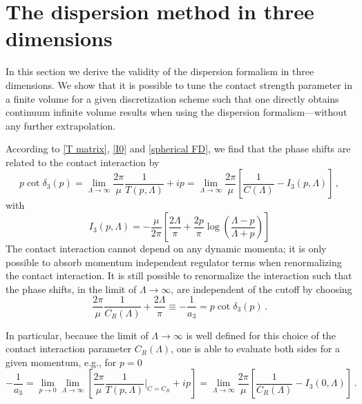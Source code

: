 \section{The dispersion method in three dimensions}\label{sec:3D dispersion}
In this section we derive the validity of the dispersion formalism in three dimensions.
We show that it is possible to tune the contact strength parameter in a finite volume for a given discretization scheme such that one directly obtains continuum infinite volume results when using the dispersion formalism---without any further extrapolation.

According to \eqref{T matrix}, \eqref{I0} and \eqref{spherical FD}, we find that the phase shifts are related to the contact interaction by
\begin{equation}
	p \cot \delta_3(p)
	= \lim\limits_{\Lambda \to \infty}\frac{2 \pi}{\mu}\frac{1}{T(p, \Lambda)} + i p
	= \lim\limits_{\Lambda \to \infty}
		\frac{2 \pi}{\mu} \left[
			\frac{1}{C(\Lambda)} - I_3(p, \Lambda)
		\right]
	\, ,
\end{equation}
with
\begin{equation}
	I_3(p, \Lambda)
	=
	-\frac{\mu}{2 \pi}
	\left[
	\frac{2 \Lambda}{\pi} + \frac{2  p}{\pi} \log \left( \frac{\Lambda - p}{\Lambda + p}\right)
	\right]
\end{equation}
The contact interaction cannot depend on any dynamic momenta; it is only possible to absorb momentum independent regulator terms when renormalizing the contact interaction.
It is still possible to renormalize the interaction such that the phase shifts, in the limit of $\Lambda \to \infty$, are independent of the cutoff by choosing
\begin{equation}\label{eq:three-d-counterterm}
	\frac{2 \pi}{\mu} \frac{1}{C_R(\Lambda)} + \frac{2 \Lambda}{\pi}
	\equiv
	- \frac{1}{a_3}
	=
	p \cot \delta_3(p)
	\, .
\end{equation}

In particular, because the limit of $\Lambda \to \infty$ is well defined for this choice of the contact interaction parameter $C_R(\Lambda)$, one is able to evaluate both sides for a given momentum, e.g., for $p=0$
\begin{equation}
	- \frac{1}{a_3}
	=
	\lim\limits_{p \to 0}\lim\limits_{\Lambda \to \infty}
		\left[
			\frac{2 \pi}{\mu}\frac{1}{T(p, \Lambda)} \bigg|_{C=C_R} + i p
	\right]
	=
	\lim\limits_{\Lambda \to \infty}
	\frac{2 \pi}{\mu}
		\left[
		\frac{1}{C_R(\Lambda)} - I_3(0, \Lambda)
		\right]
	\, .
\end{equation}

